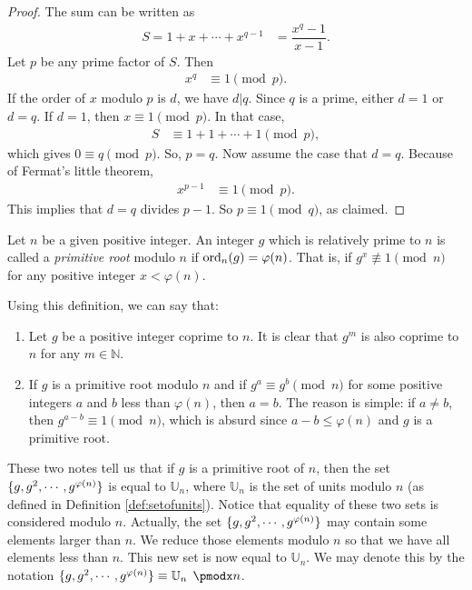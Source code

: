 \documentclass{subfile}
\begin{document}
	\begin{proof}
		The sum can be written as
			\begin{align*}
				S = 1+x+\cdots+x^{q-1} & = \dfrac{x^q-1}{x-1}.
			\end{align*}
		Let $p$ be any prime factor of $S$. Then
			\begin{align*}
				x^q & \equiv1\pmod p.
			\end{align*}
		If the order of $x$ modulo $p$ is $d$, we have $d|q$. Since $q$ is a prime, either $d=1$ or $d=q$. If $d=1$, then $x\equiv1\pmod p$. In that case,
			\begin{align*}
				S & \equiv 1+1+\cdots+1\pmod p,
			\end{align*}
		which gives $0  \equiv q\pmod p$. So, $p=q$. Now assume the case that $d=q$. Because of Fermat's little theorem,
			\begin{align*}
				x^{p-1} & \equiv1\pmod p.
			\end{align*}
		This implies that $d=q$ divides $p-1$. So $p\equiv1\pmod q$, as claimed.
	\end{proof}
	
	\begin{definition}
		Let $n$ be a given positive integer. An integer $g$ which is relatively prime to $n$  is called a \textit{primitive root} modulo $n$ if $\operatorname{ord}_n(g)=\varphi(n)$. That is, if $g^x\not\equiv1\pmod n$ for any positive integer $x<\varphi(n)$. 
	\end{definition}

	\begin{note}
		Using this definition, we can say that:
			\begin{enumerate}
				\item Let $g$ be a positive integer coprime to $n$. It is clear that $g^m$ is also coprime to $n$ for any $m \in \mathbb N$. 
				\item If $g$ is a primitive root modulo $n$ and if $g^a \equiv g^b \pmod n$ for some positive integers $a$ and $b$ less than $\varphi(n)$, then $a=b$. The reason is simple: if $a \neq b$, then $g^{a-b} \equiv 1 \pmod n$, which is absurd since $a-b \leq \varphi(n)$ and $g$ is a primitive root.
			\end{enumerate}
	\end{note}
		
These two notes tell us that if $g$ is a primitive root of $n$, then the set $\{g,g^2,\cdots,g^{\varphi(n)}\}$ is equal to $\mathbb U_n$, where $\mathbb U_n$ is the set of units modulo $n$ (as defined in Definition \ref{def:setofunits}). Notice that equality of these two sets is considered modulo $n$. Actually, the set $\{g,g^2,\cdots,g^{\varphi(n)}\}$ may contain some elements larger than $n$. We reduce those elements modulo $n$ so that we have all elements less than $n$. This new set is now equal to $\mathbb U_n$. We may denote this by the notation $\{g,g^2,\cdots,g^{\t(n)}\} \equiv \mathbb U_n \pmod n$.
\end{document}

